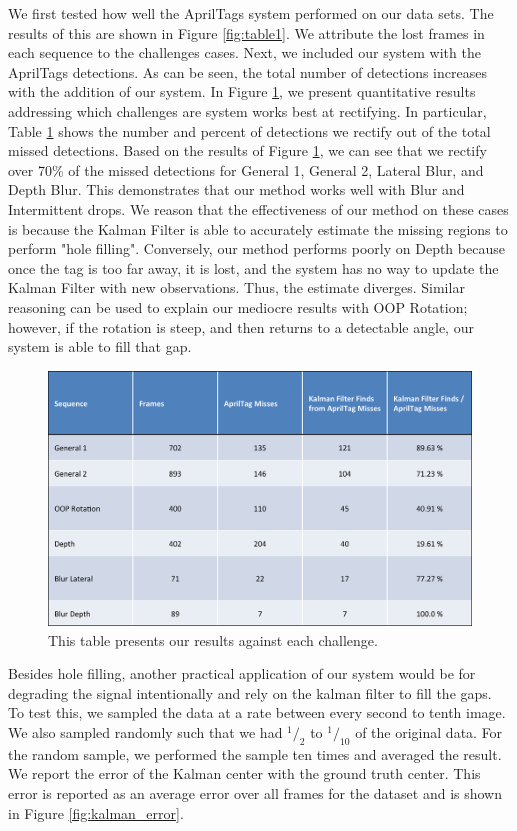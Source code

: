 \documentclass[letterpaper,10pt,conference]{IEEEtran}
\begin{document}
We first tested how well the AprilTags system performed on our data sets. The results of this are shown in Figure \ref{fig:table1}. We attribute the lost frames in each sequence to the challenges cases. Next, we included our system with the AprilTags detections. As can be seen, the total number of detections increases with the addition of our system. In Figure \ref{fig:table2}, we present quantitative results addressing which challenges are system works best at rectifying. In particular, Table \ref{fig:table2} shows the number and percent of detections we rectify out of the total missed detections. Based on the results of Figure \ref{fig:table2}, we can see that we rectify over 70\% of the missed detections for General 1, General 2, Lateral Blur, and Depth Blur. This demonstrates that our method works well with Blur and Intermittent drops. We reason that the effectiveness of our method on these cases is because the Kalman Filter is able to accurately estimate the missing regions to perform "hole filling". Conversely, our method performs poorly on Depth because once the tag is too far away, it is lost, and the system has no way to update the Kalman Filter with new observations. Thus, the estimate diverges. Similar reasoning can be used to explain our mediocre results with OOP Rotation; however, if the rotation is steep, and then returns to a detectable angle, our system is able to fill that gap.

\begin{figure}
\centering
\includegraphics[scale=.4]{table2}
\caption{This table presents our results against each challenge.}
\label{fig:table2}
\end{figure}

Besides hole filling, another practical application of our system would be for degrading the signal intentionally and rely on the kalman filter to fill the gaps. To test this, we sampled the data at a rate between every second to tenth image.  We also sampled randomly such that we had $^1/_2$ to $^1/_{10}$ of the original data.  For the random sample, we performed the sample ten times and averaged the result. We report the error of the Kalman center with the ground truth center.  This error is reported as an average error over all frames for the dataset and is shown in Figure \ref{fig:kalman_error}.
\end{document}
